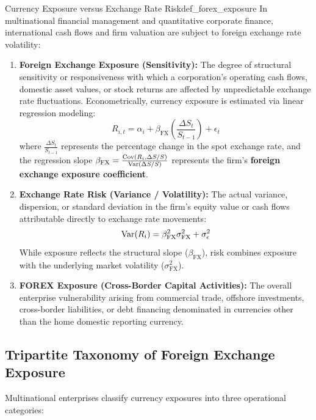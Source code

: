 \begin{definition}{Currency Exposure versus Exchange Rate Risk}{def_forex_exposure}
In multinational financial management and quantitative corporate finance, international cash flows and firm valuation are subject to foreign exchange rate volatility:
\begin{enumerate}[leftmargin=*, topsep=2pt, itemsep=3pt]
    \item \textbf{Foreign Exchange Exposure (Sensitivity):} The degree of structural sensitivity or responsiveness with which a corporation's operating cash flows, domestic asset values, or stock returns are affected by unpredictable exchange rate fluctuations.
    Econometrically, currency exposure is estimated via linear regression modeling:
    \begin{equation}
        R_{i, t} = \alpha_i + \beta_{\text{FX}} \left(\frac{\Delta S_t}{S_{t-1}}\right) + \epsilon_t
    \end{equation}
    where $\frac{\Delta S_t}{S_{t-1}}$ represents the percentage change in the spot exchange rate, and the regression slope $\beta_{\text{FX}} = \frac{\operatorname{Cov}(R_i, \Delta S/S)}{\operatorname{Var}(\Delta S/S)}$ represents the firm's \textbf{foreign exchange exposure coefficient}.

    \item \textbf{Exchange Rate Risk (Variance / Volatility):} The actual variance, dispersion, or standard deviation in the firm's equity value or cash flows attributable directly to exchange rate movements:
    \begin{equation}
        \operatorname{Var}(R_{i}) = \beta_{\text{FX}}^2 \sigma_{\text{FX}}^2 + \sigma_\epsilon^2
    \end{equation}
    While exposure reflects the structural slope ($\beta_{\text{FX}}$), risk combines exposure with the underlying market volatility ($\sigma_{\text{FX}}^2$).

    \item \textbf{FOREX Exposure (Cross-Border Capital Activities):} The overall enterprise vulnerability arising from commercial trade, offshore investments, cross-border liabilities, or debt financing denominated in currencies other than the home domestic reporting currency.
\end{enumerate}
\end{definition}

\subsection{Tripartite Taxonomy of Foreign Exchange Exposure}
Multinational enterprises classify currency exposures into three operational categories:

